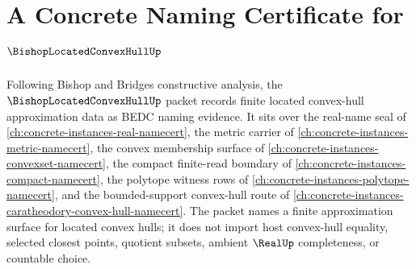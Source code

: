 \chapter{A Concrete Naming Certificate for $\BishopLocatedConvexHullUp$}
\label{ch:concrete-instances-bishop-located-convex-hull-namecert}

Following Bishop and Bridges constructive analysis, the $\BishopLocatedConvexHullUp$ packet records finite located convex-hull approximation data as BEDC naming evidence. It sits over the real-name seal of \autoref{ch:concrete-instances-real-namecert}, the metric carrier of \autoref{ch:concrete-instances-metric-namecert}, the convex membership surface of \autoref{ch:concrete-instances-convexset-namecert}, the compact finite-read boundary of \autoref{ch:concrete-instances-compact-namecert}, the polytope witness rows of \autoref{ch:concrete-instances-polytope-namecert}, and the bounded-support convex-hull route of \autoref{ch:concrete-instances-caratheodory-convex-hull-namecert}. The packet names a finite approximation surface for located convex hulls; it does not import host convex-hull equality, selected closest points, quotient subsets, ambient $\RealUp$ completeness, or countable choice.

